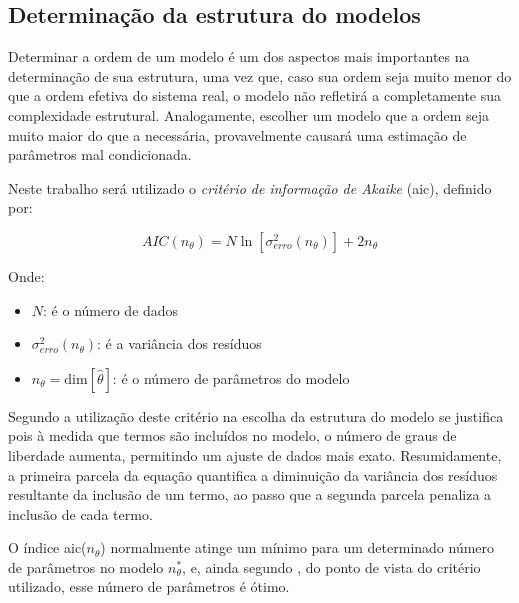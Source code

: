 \subsection{Determinação da estrutura do modelos}
\label{subsec:determinacao_da_estrutura_do_modelo}

Determinar a ordem de um modelo é um dos aspectos mais importantes na determinação de sua estrutura,
uma vez que, caso sua ordem seja muito menor do que a ordem efetiva do sistema real, o modelo não
refletirá a completamente sua complexidade estrutural. Analogamente, escolher um modelo que a ordem
seja muito maior do que a necessária, provavelmente causará uma estimação de parâmetros mal condicionada.
\cite{Aguirre2015}

Neste trabalho será utilizado o \textit{critério de informação de Akaike} 
(\acrshort{aic}), definido por:

\begin{equation}
	\label{eq:aic}
	AIC(n_\theta) = N \ln \left[ \sigma_{erro}^2 (n_\theta) \right] + 2n_\theta
\end{equation}

\noindent
Onde: 
\begin{itemize}
	\item $N$: é o número de dados
	\item $\sigma_{erro}^2 (n_\theta)$: é a variância dos resíduos
	\item $n_\theta = \mathrm{dim}[\hat{\theta}]$: é o número de parâmetros do modelo
\end{itemize}

Segundo  a utilização deste critério na escolha da estrutura do modelo se justifica
pois à medida que termos são incluídos no modelo, o número de graus de liberdade aumenta, permitindo
um ajuste de dados mais exato. Resumidamente, a primeira parcela da equação quantifica a diminuição
da variância dos resíduos resultante da inclusão de um termo, ao passo que a segunda parcela penaliza
a inclusão de cada termo.

O índice \acrshort{aic}($n_\theta$) normalmente atinge um mínimo para um determinado número de parâmetros
no modelo $n_{\theta}^*$, e, ainda segundo , do ponto de vista do critério utilizado,
esse número de parâmetros é ótimo.

